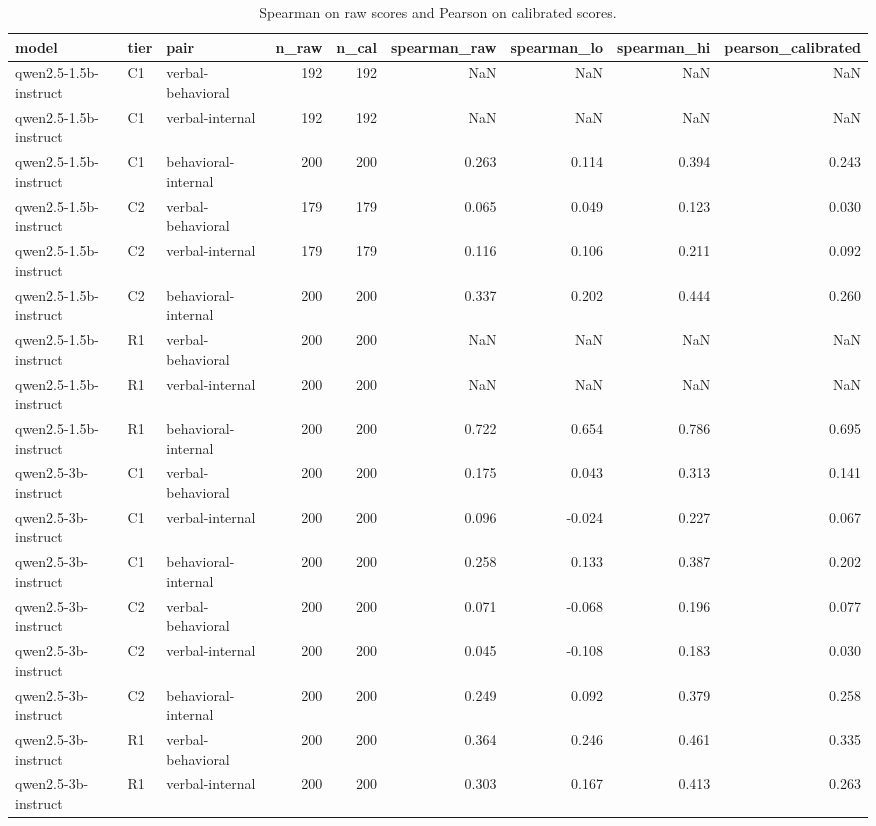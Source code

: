 \begin{table}
\caption{Spearman on raw scores and Pearson on calibrated scores.}
\label{tab:t9_signal_correlations}
\begin{tabular}{lllrrrrrr}
\toprule
model & tier & pair & n\_raw & n\_cal & spearman\_raw & spearman\_lo & spearman\_hi & pearson\_calibrated \\
\midrule
qwen2.5-1.5b-instruct & C1 & verbal-behavioral & 192 & 192 & NaN & NaN & NaN & NaN \\
qwen2.5-1.5b-instruct & C1 & verbal-internal & 192 & 192 & NaN & NaN & NaN & NaN \\
qwen2.5-1.5b-instruct & C1 & behavioral-internal & 200 & 200 & 0.263 & 0.114 & 0.394 & 0.243 \\
qwen2.5-1.5b-instruct & C2 & verbal-behavioral & 179 & 179 & 0.065 & 0.049 & 0.123 & 0.030 \\
qwen2.5-1.5b-instruct & C2 & verbal-internal & 179 & 179 & 0.116 & 0.106 & 0.211 & 0.092 \\
qwen2.5-1.5b-instruct & C2 & behavioral-internal & 200 & 200 & 0.337 & 0.202 & 0.444 & 0.260 \\
qwen2.5-1.5b-instruct & R1 & verbal-behavioral & 200 & 200 & NaN & NaN & NaN & NaN \\
qwen2.5-1.5b-instruct & R1 & verbal-internal & 200 & 200 & NaN & NaN & NaN & NaN \\
qwen2.5-1.5b-instruct & R1 & behavioral-internal & 200 & 200 & 0.722 & 0.654 & 0.786 & 0.695 \\
qwen2.5-3b-instruct & C1 & verbal-behavioral & 200 & 200 & 0.175 & 0.043 & 0.313 & 0.141 \\
qwen2.5-3b-instruct & C1 & verbal-internal & 200 & 200 & 0.096 & -0.024 & 0.227 & 0.067 \\
qwen2.5-3b-instruct & C1 & behavioral-internal & 200 & 200 & 0.258 & 0.133 & 0.387 & 0.202 \\
qwen2.5-3b-instruct & C2 & verbal-behavioral & 200 & 200 & 0.071 & -0.068 & 0.196 & 0.077 \\
qwen2.5-3b-instruct & C2 & verbal-internal & 200 & 200 & 0.045 & -0.108 & 0.183 & 0.030 \\
qwen2.5-3b-instruct & C2 & behavioral-internal & 200 & 200 & 0.249 & 0.092 & 0.379 & 0.258 \\
qwen2.5-3b-instruct & R1 & verbal-behavioral & 200 & 200 & 0.364 & 0.246 & 0.461 & 0.335 \\
qwen2.5-3b-instruct & R1 & verbal-internal & 200 & 200 & 0.303 & 0.167 & 0.413 & 0.263 \\

\end{tabular}
\end{table}
